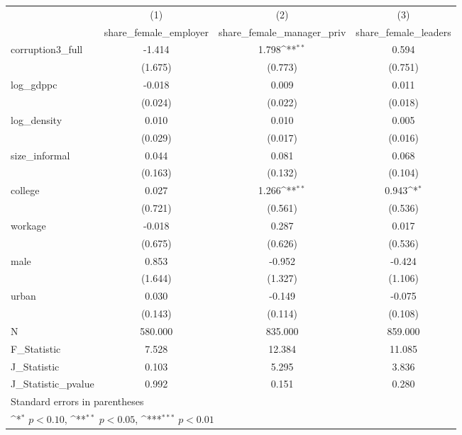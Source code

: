 {
\def\sym#1{\ifmmode^{#1}\else\(^{#1}\)\fi}
\begin{tabular}{l*{3}{c}}
\hline\hline
            &\multicolumn{1}{c}{(1)}&\multicolumn{1}{c}{(2)}&\multicolumn{1}{c}{(3)}\\
            &\multicolumn{1}{c}{share\_female\_employer}&\multicolumn{1}{c}{share\_female\_manager\_priv}&\multicolumn{1}{c}{share\_female\_leaders}\\
\hline
corruption3\_full&      -1.414         &       1.798\sym{**} &       0.594         \\
            &     (1.675)         &     (0.773)         &     (0.751)         \\
[1em]
log\_gdppc   &      -0.018         &       0.009         &       0.011         \\
            &     (0.024)         &     (0.022)         &     (0.018)         \\
[1em]
log\_density &       0.010         &       0.010         &       0.005         \\
            &     (0.029)         &     (0.017)         &     (0.016)         \\
[1em]
size\_informal&       0.044         &       0.081         &       0.068         \\
            &     (0.163)         &     (0.132)         &     (0.104)         \\
[1em]
college     &       0.027         &       1.266\sym{**} &       0.943\sym{*}  \\
            &     (0.721)         &     (0.561)         &     (0.536)         \\
[1em]
workage     &      -0.018         &       0.287         &       0.017         \\
            &     (0.675)         &     (0.626)         &     (0.536)         \\
[1em]
male        &       0.853         &      -0.952         &      -0.424         \\
            &     (1.644)         &     (1.327)         &     (1.106)         \\
[1em]
urban       &       0.030         &      -0.149         &      -0.075         \\
            &     (0.143)         &     (0.114)         &     (0.108)         \\
\hline
N           &     580.000         &     835.000         &     859.000         \\
F\_Statistic &       7.528         &      12.384         &      11.085         \\
J\_Statistic &       0.103         &       5.295         &       3.836         \\
J\_Statistic\_pvalue&       0.992         &       0.151         &       0.280         \\
\hline\hline
\multicolumn{4}{l}{\footnotesize Standard errors in parentheses}\\
\multicolumn{4}{l}{\footnotesize \sym{*} \(p<0.10\), \sym{**} \(p<0.05\), \sym{***} \(p<0.01\)}\\
\end{tabular}
}
